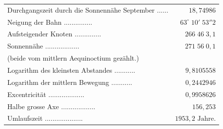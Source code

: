 \begin{center}\fontsize{9}{11}\selectfont\setlength{\tabcolsep}{3pt}\renewcommand{\arraystretch}{1.15}\begin{tabular}{lr}
Durchgangszeit durch die Sonnennähe September .\;.\;.\;.\;.\;.\; & $18{,}74986$\\
Neigung der Bahn .\;.\;.\;.\;.\;.\;.\;.\;.\;.\;.\;.\;.\;.\;.\; & $63^\circ\;10'\;53''2$\\
Aufsteigender Knoten .\;.\;.\;.\;.\;.\;.\;.\;.\;.\;.\;.\;.\;.\; & $266\;46\;3{,}1$\\
Sonnennähe .\;.\;.\;.\;.\;.\;.\;.\;.\;.\;.\;.\;.\;.\;.\;.\;.\;.\; & $271\;56\;0{,}1$\\
\multicolumn{2}{l}{(beide vom mittlern Aequinoctium gezählt.)}\\
Logarithm des kleinsten Abstandes .\;.\;.\;.\;.\;.\;.\;.\;.\;.\;.\; & $9{,}8105558$\\
Logarithm der mittlern Bewegung .\;.\;.\;.\;.\;.\;.\;.\;.\;.\;.\; & $0{,}2442946$\\
Excentricität .\;.\;.\;.\;.\;.\;.\;.\;.\;.\;.\;.\;.\;.\;.\;.\;.\;.\;.\; & $0{,}9958626$\\
Halbe grosse Axe .\;.\;.\;.\;.\;.\;.\;.\;.\;.\;.\;.\;.\;.\;.\;.\;.\;.\; & $156{,}253$\\
Umlaufszeit .\;.\;.\;.\;.\;.\;.\;.\;.\;.\;.\;.\;.\;.\;.\;.\;.\;.\;.\;.\; & $1953{,}2\text{ Jahre.}$\\
\end{tabular}\end{center}
